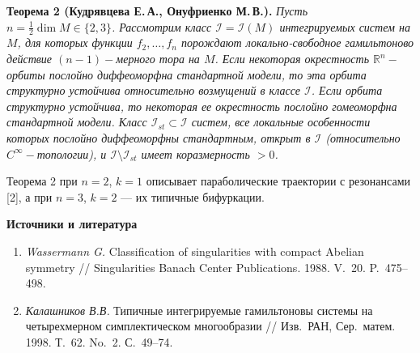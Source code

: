 \documentclass[a4paper, 12pt, oneside]{ncc}
\begin{document}
\textbf{Теорема 2 (Кудрявцева Е.\,А., Онуфриенко М.\,В.). } {\sl Пусть $n=\frac12\dim M\in\{2,3\}$. Рассмотрим класс $\mathcal I=\mathcal I(M)$ интегрируемых систем на $M$, для которых функции $f_2,\dots,f_n$ порождают локально-свободное гамильтоново действие $(n-1)-$мерного тора на $M$. Если некоторая окрестность $\mathbb{R}^n-$орбиты послойно диффеоморфна стандартной модели, то эта орбита структурно устойчива относительно возмущений в классе $\mathcal I$. Если орбита структурно устойчива, то некоторая ее окрестность послойно гомеоморфна стандартной модели. Класс $\mathcal I_{st}\subset\mathcal I$ систем, все локальные особенности которых послойно диффеоморфны стандартным, открыт в $\mathcal I$ (относительно $C^\infty-$топологии), и $\mathcal I\setminus\mathcal I_{st}$ имеет коразмерность $>0$.}

\smallskip
Теорема 2 при $n=2$, $k=1$ описывает параболические траектории с резонансами [2], а при $n=3$, $k=2$ --- их типичные бифуркации.

\begin{center}\textbf{Источники и литература}\end{center}
\begin{enumerate}
\item {\em Wassermann G.} Classification of singularities with compact Abelian symmetry // Singularities Banach Center Publications. 1988. V.~20. P.~475--498.{\sloppy

}
\item {\em Калашников В.В.} Типичные интегрируемые гамильтоновы системы на четырехмерном симплектическом многообразии // Изв.\ РАН, Сер.\ матем. 1998. Т.~62. No.~2. С.~49--74.{\sloppy

}
\end{enumerate}
\\
\end{document}
